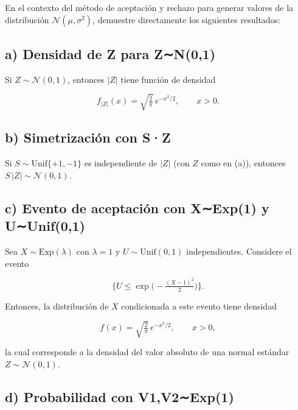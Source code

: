 \documentclass[10pt,a4paper]{article}
\let\le\leqslant
\let\leq\leqslant
\let\le\leq
\begin{document}
    En el contexto del método de aceptación y rechazo para generar valores
de la distribución \(\mathcal{N}(\mu, \sigma^{2})\), demuestre
directamente los siguientes resultados:

    \hypertarget{a-densidad-de-z-para-zn01}{%
\subsection{a) Densidad de \textbar Z\textbar{} para
Z∼N(0,1)}\label{a-densidad-de-z-para-zn01}}

    Si \(Z \sim \mathcal{N}(0,1)\), entonces \(|Z|\) tiene función de
densidad

\[
f_{|Z|}(x) = \sqrt{\tfrac{2}{\pi}}\, e^{-x^{2}/2}, \qquad x > 0.
\]

    \hypertarget{b-simetrizaciuxf3n-con-sz}{%
\subsection{b) Simetrización con
S·\textbar Z\textbar{}}\label{b-simetrizaciuxf3n-con-sz}}

    Si \(S \sim \text{Unif}\{+1,-1\}\) es independiente de \(|Z|\) (con
\(Z\) como en (a)), entonces \(S\,|Z| \sim \mathcal{N}(0,1)\).

    \hypertarget{c-evento-de-aceptaciuxf3n-con-xexp1-y-uunif01}{%
\subsection{c) Evento de aceptación con X∼Exp(1) y
U∼Unif(0,1)}\label{c-evento-de-aceptaciuxf3n-con-xexp1-y-uunif01}}

    Sea \(X \sim \text{Exp}(\lambda)\) con \(\lambda = 1\) y
\(U \sim \text{Unif}(0,1)\) independientes. Considere el evento

\[
\big\{ U \le \exp\big(-\tfrac{(X-1)^{2}}{2}\big) \big\}.
\]

Entonces, la distribución de \(X\) condicionada a este evento tiene
densidad

\[
f(x) = \sqrt{\tfrac{2}{\pi}}\, e^{-x^{2}/2}, \qquad x > 0,
\]

la cual corresponde a la densidad del valor absoluto de una normal
estándar \(Z \sim \mathcal{N}(0,1)\).

    \hypertarget{d-probabilidad-con-v1v2exp1}{%
\subsection{d) Probabilidad con
V1,V2∼Exp(1)}\label{d-probabilidad-con-v1v2exp1}}
\end{document}
